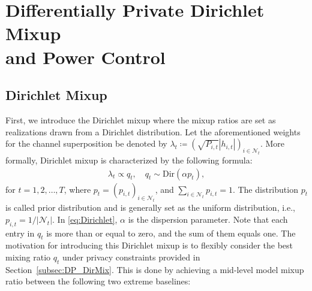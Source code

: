 \documentclass[conference,10pt]{IEEEtran}
\theoremstyle{definition}
\theoremstyle{definition}
\begin{document}
\section{Differentially Private Dirichlet Mixup \\ and Power Control}


\subsection{Dirichlet Mixup}
First, we introduce the Dirichlet mixup where the mixup ratios are set as realizations drawn from a Dirichlet distribution.
Let the aforementioned weights for the channel superposition be denoted by $\lambda_t \coloneqq (\sqrt{P_{i, t}}|h_{i, t}|)_{i\in\mathcal{N}_t}$.
More formally, Dirichlet mixup is characterized by the following formula:
\begin{align}
	\label{eq:Dirichlet}
	\textstyle \lambda_t \propto q_t, \quad q_t\sim \mathrm{Dir}(\alpha p_t),
\end{align}
for $t = 1, 2, \dots, T$, where $p_t = (p_{i, t})_{i\in\mathcal{N}_t}$, and $\sum_{i\in\mathcal{N}_t}p_{i, t} = 1$.
The distribution $p_t$ is called prior distribution and is generally set as the uniform distribution, i.e., $p_{i, t} = 1/|\mathcal{N}_t|$.
In \eqref{eq:Dirichlet}, $\alpha$ is the dispersion parameter.
Note that each entry in $q_t$ is more than or equal to zero, and the sum of them equals one.
The motivation for introducing this Dirichlet mixup is to flexibly consider the best mixing ratio $q_t$ under privacy constraints provided in Section~\ref{subsec:DP_DirMix}.
This is done by achieving a mid-level model mixup ratio between the following two extreme baselines:
\end{document}
